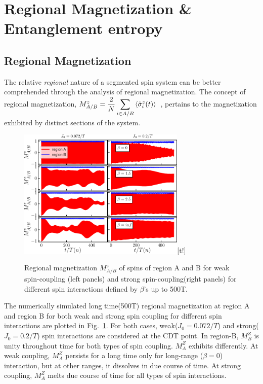 \documentclass[%
reprint,
superscriptaddress,
amsmath,amssymb,showkeys,
aps,
prb,
]{revtex4-2}
\begin{document}
	\section{\label{sec:level4}Regional  Magnetization \& Entanglement entropy}
	
	\subsection{\label{sec:level42} Regional Magnetization}
	The relative \textit{regional} nature of a segmented spin system can be better comprehended through the analysis of regional magnetization. The concept of regional magnetization, $\displaystyle M^z_{A/B}=\frac{2}{N}\sum_{i\in{A/B}}\expval{\hat{\sigma}^z_i(t)}$~\cite{sakurai_phys_nodate}, pertains to the magnetization exhibited by distinct sections of the system.
	\begin{figure}
		\centering
		\includegraphics[width = 8cm]{clean_J_strong_MzAB_betas.pdf}[t!]
		\caption{Regional magnetization $M^z_{A/B}$ of spins of region A and B for weak spin-coupling (left panels) and strong spin-coupling(right panels) for different spin interactions defined by $\beta$'s up to 500T.}
		\label{Fig:regiogionalmag}
	\end{figure}
	The numerically simulated long time(500T) regional magnetization at region A and region B for both weak and strong spin coupling for different spin interactions are plotted in Fig.~\ref{Fig:regiogionalmag}. For both cases, weak($J_0=0.072/T$) and strong($J_0=0.2/T$) spin interactions are considered at the CDT point. In region-B,  $M^Z_B$ is unity throughout time for both types of spin coupling. $M^Z_A$ exhibits differently. At weak coupling, $M^Z_A$ persists for a long time only for long-range ($\beta=0$) interaction, but at other ranges, it dissolves in due course of time. At strong coupling, $M^Z_A$ melts due course of time for all types of spin interactions.
	
\end{document}
